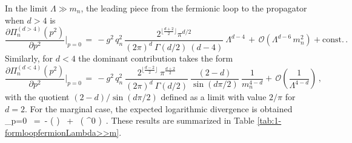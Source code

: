 %
%
In the limit $\Lambda \gg m_n$, the leading piece from the fermionic loop to the propagator when $d>4$ is
%
\begin{equation}
			\frac {\partial \Pi_n^{(d>4)}(p^2)}{\partial p^2} \bigg\rvert_{p=0}\, = \, -g^2\, q_n^2\,  \frac{2^{\lfloor \frac{d+2}{2} \rfloor} \pi^{d/2}}{(2 \pi)^d\ \Gamma\left( d/2 \right) \ (d-4)}   \ \Lambda^{d-4} \, + \, \mathcal{O}\left(\Lambda^{d-6}\, m_n^2\right) + \mathrm{const.}\, .
\label{eq:1-formloopfermionsd>4}
\end{equation}
%
Similarly, for $d<4$ the dominant contribution takes the form
%
\begin{equation}
			\frac {\partial \Pi_n^{(d<4)}(p^2)}{\partial p^2} \bigg\rvert_{p=0}\, = \, - g^2\, q_n^2 \ \frac{2^{\lfloor\frac{d-2}{2} \rfloor} \ \pi^{\frac{d+2}{2}} }{(2 \pi)^d  \ \Gamma\left( d/2 \right)} \ \frac{(2-d)}{\sin\left( d \pi/2\right)} \ \frac{1}{m_n^{4-d}} + \, \mathcal{O}\left(\frac{1}{\Lambda^{4-d}}\right)\, ,
\label{eq:1-formloopfermionsd<4}
\end{equation}
%
with the quotient $(2-d)/\sin\left( d \pi/2\right)$  defined as a limit with value $2/ \pi$ for $d=2$. For the marginal case,  the expected logarithmic divergence is obtained
%
\beq
		 \bigg\rvert_{p=0} \, =\, -  \log \left(  \right) \ + \ \left( \Lambda^0 \right)\, .
\label{eq:1-formloopfermionsd=}
\eeq
%
These results are summarized in Table \ref{tab:1-formloopfermionLambda>>m}.
		
